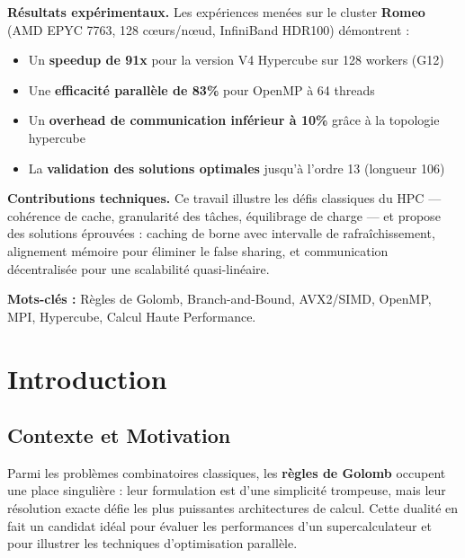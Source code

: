 \documentclass[12pt,a4paper,twoside]{report}
\begin{document}
\vspace{0.3cm}

\textbf{Résultats expérimentaux.} Les expériences menées sur le cluster \textbf{Romeo} (AMD EPYC 7763, 128 cœurs/nœud, InfiniBand HDR100) démontrent :

\begin{itemize}[leftmargin=*, itemsep=2pt]
    \item Un \textbf{speedup de 91x} pour la version V4 Hypercube sur 128 workers (G12)
    \item Une \textbf{efficacité parallèle de 83\%} pour OpenMP à 64 threads
    \item Un \textbf{overhead de communication inférieur à 10\%} grâce à la topologie hypercube
    \item La \textbf{validation des solutions optimales} jusqu'à l'ordre 13 (longueur 106)
\end{itemize}

\vspace{0.3cm}

\textbf{Contributions techniques.} Ce travail illustre les défis classiques du HPC --- cohérence de cache, granularité des tâches, équilibrage de charge --- et propose des solutions éprouvées : caching de borne avec intervalle de rafraîchissement, alignement mémoire pour éliminer le false sharing, et communication décentralisée pour une scalabilité quasi-linéaire.

\vspace{0.3cm}

\noindent\textbf{Mots-clés :} Règles de Golomb, Branch-and-Bound, AVX2/SIMD, OpenMP, MPI, Hypercube, Calcul Haute Performance.

\newpage


\chapter{Introduction}

\section{Contexte et Motivation}

Parmi les problèmes combinatoires classiques, les \textbf{règles de Golomb} occupent une place singulière : leur formulation est d'une simplicité trompeuse, mais leur résolution exacte défie les plus puissantes architectures de calcul. Cette dualité en fait un candidat idéal pour évaluer les performances d'un supercalculateur et pour illustrer les techniques d'optimisation parallèle.
\end{document}
